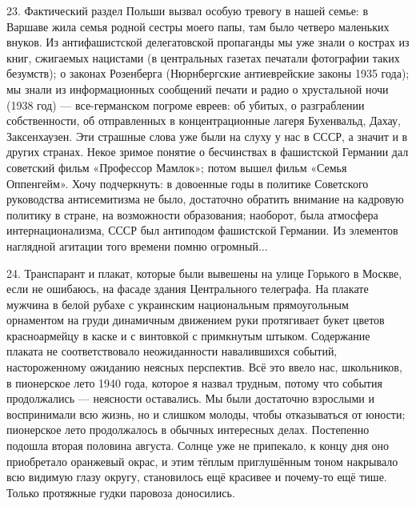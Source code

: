 23. Фактический раздел Польши вызвал особую тревогу в нашей семье: в Варшаве жила семья родной сестры моего папы, там было четверо маленьких внуков. Из антифашистской делегатовской пропаганды мы уже знали о кострах из книг, сжигаемых нацистами (в центральных газетах печатали фотографии таких безумств); о законах Розенберга (Нюрнбергские антиеврейские законы 1935 года); мы знали из информационных сообщений печати и радио о хрустальной ночи (1938 год) — все-германском погроме евреев: об убитых, о разграблении собственности, об отправленных в концентрационные лагеря Бухенвальд, Дахау, Заксенхаузен. Эти страшные слова уже были на слуху у нас в СССР, а значит и в других странах. Некое зримое понятие о бесчинствах в фашистской Германии дал советский фильм «Профессор Мамлок»; потом вышел фильм «Семья Оппенгейм». Хочу подчеркнуть: в довоенные годы в политике Советского руководства антисемитизма не было, достаточно обратить внимание на кадровую политику в стране, на возможности образования; наоборот, была атмосфера интернационализма, СССР был антиподом фашистской Германии. Из элементов наглядной агитации того времени помню огромный...

24. Транспарант и плакат, которые были вывешены на улице Горького в Москве, если не ошибаюсь, на фасаде здания Центрального телеграфа. На плакате мужчина в белой рубахе с украинским национальным прямоугольным орнаментом на груди динамичным движением руки протягивает букет цветов красноармейцу в каске и с винтовкой с примкнутым штыком. Содержание плаката не соответствовало неожиданности навалившихся событий, настороженному ожиданию неясных перспектив. Всё это ввело нас, школьников, в пионерское лето 1940 года, которое я назвал трудным, потому что события продолжались — неясности оставались. Мы были достаточно взрослыми и воспринимали всю жизнь, но и слишком молоды, чтобы отказываться от юности; пионерское лето продолжалось в обычных интересных делах. Постепенно подошла вторая половина августа. Солнце уже не припекало, к концу дня оно приобретало оранжевый окрас, и этим тёплым приглушённым тоном накрывало всю видимую глазу округу, становилось ещё красивее и почему-то ещё тише. Только протяжные гудки паровоза доносились.

